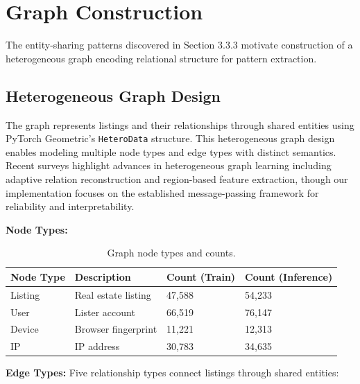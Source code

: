 \section{Graph Construction}
\label{sec:3_5}

The entity-sharing patterns discovered in Section 3.3.3 motivate construction of a heterogeneous graph encoding relational structure for pattern extraction.

\subsection{Heterogeneous Graph Design}

The graph represents listings and their relationships through shared entities using PyTorch Geometric's \texttt{HeteroData} structure. This heterogeneous graph design \cite{hu2020heterogeneous,schlichtkrull2018modeling} enables modeling multiple node types and edge types with distinct semantics. Recent surveys \cite{yang2024heterogeneous} highlight advances in heterogeneous graph learning including adaptive relation reconstruction and region-based feature extraction, though our implementation focuses on the established message-passing framework for reliability and interpretability.

\textbf{Node Types:}

\begin{table}[h]
\centering
\caption{Graph node types and counts.}
\begin{tabular}{llll}
\hline
Node Type & Description & Count (Train) & Count (Inference) \\
\hline
Listing & Real estate listing & 47,588 & 54,233 \\
User & Lister account & 66,519 & 76,147 \\
Device & Browser fingerprint & 11,221 & 12,313 \\
IP & IP address & 30,783 & 34,635 \\
\hline
\end{tabular}
\end{table}

\textbf{Edge Types:} Five relationship types connect listings through shared entities:

